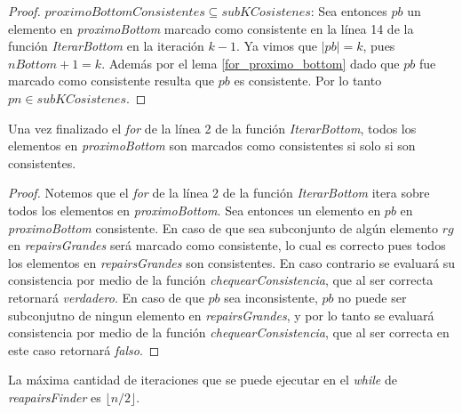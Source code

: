 \documentclass[11pt,a4paper,twoside]{tesis}
\newcommand{\parteEntera}{\lfloor n/2 \rfloor}
\newcommand{\reapairsFinder}{\textit{reapairsFinder }}
\begin{document}
\begin{proof}
\underline{$proximoBottomConsistentes \subseteq subKCosistenes$}: Sea entonces $pb$ un elemento en \textit{proximoBottom} marcado como consistente en la línea 14 de la función \textit{IterarBottom} en la iteración $k-1$. Ya vimos que $|pb| = k$, pues $nBottom + 1 = k$. Además por el lema \ref{for_proximo_bottom} dado que $pb$ fue marcado como consistente resulta que $pb$ es consistente. Por lo tanto $pn \in subKCosistenes$. 

\end{proof}


\begin{lemma}\label{for_proximo_bottom}
Una vez finalizado el \textit{for} de la línea 2 de la función \textit{IterarBottom}, todos los elementos en \textit{proximoBottom} son marcados como consistentes si solo si son consistentes.
\end{lemma}

\begin{proof}
Notemos que el \textit{for} de la línea 2 de la función \textit{IterarBottom} itera sobre todos los elementos en \textit{proximoBottom}. Sea entonces un elemento en $pb$ en \textit{proximoBottom} consistente. En caso de que sea subconjunto de algún elemento $rg$ en \textit{repairsGrandes} será marcado como consistente, lo cual es correcto pues todos los elementos en \textit{repairsGrandes} son consistentes.  En caso contrario se evaluará su consistencia por medio de la función \textit{chequearConsistencia}, que al ser correcta retornará \textit{verdadero}. En caso de que $pb$ sea inconsistente, $pb$ no puede ser subconjutno de ningun elemento en \textit{repairsGrandes}, y por lo tanto se evaluará consistencia por medio de la función \textit{chequearConsistencia}, que al ser correcta en este caso retornará \textit{falso}.  
\end{proof}

\begin{lemma}\label{maxima_cantidad_de_iteraciones}
La máxima cantidad de iteraciones que se puede ejecutar en el \textit{while} de \reapairsFinder es $\parteEntera$.
\end{lemma}
\end{document}
